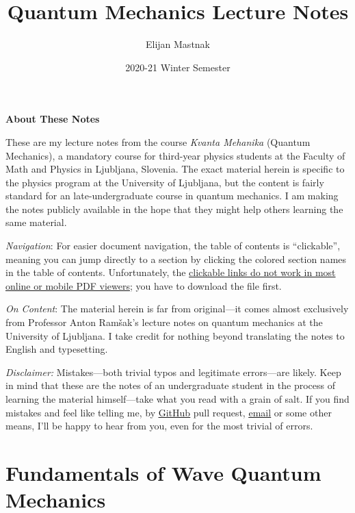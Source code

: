 \documentclass[11pt, a4paper]{article}
\begin{document}
\title{Quantum Mechanics Lecture Notes}
\author{Elijan Mastnak}
\date{2020-21 Winter Semester}
\maketitle

\begin{center}
\textbf{About These Notes}
\end{center}
These are my lecture notes from the course \textit{Kvanta Mehanika} (Quantum Mechanics), a mandatory course for third-year physics students at the Faculty of Math and Physics in Ljubljana, Slovenia. The exact material herein is specific to the physics program at the University of Ljubljana, but the content is fairly standard for an late-undergraduate course in quantum mechanics. I am making the notes publicly available in the hope that they might help others learning the same material.


\vspace{2mm}
\textit{Navigation}: For easier document navigation, the table of contents is ``clickable'', meaning you can jump directly to a section by clicking the colored section names in the table of contents. Unfortunately, the \uline{clickable links do not work in most online or mobile PDF viewers}; you have to download the file first.

\vspace{2mm}
\textit{On Content}: The material herein is far from original---it comes almost exclusively from Professor Anton Ram\v{s}ak's lecture notes on quantum mechanics at the University of Ljubljana. I take credit for nothing beyond translating the notes to English and typesetting.

\vspace{2mm}
\textit{Disclaimer:} Mistakes---both trivial typos and legitimate errors---are likely. Keep in mind that these are the notes of an undergraduate student in the process of learning the material himself---take what you read with a grain of salt. If you find mistakes and feel like telling me, by \href{https://github.com/ejmastnak/fmf}{\underline{GitHub}} pull request, \href{mailto:ejmastnak@gmail.com}{\underline{email}} or some other means, I'll be happy to hear from you, even for the most trivial of errors.

\newpage

\tableofcontents

\newpage

\section{Fundamentals of Wave Quantum Mechanics}
\end{document}
